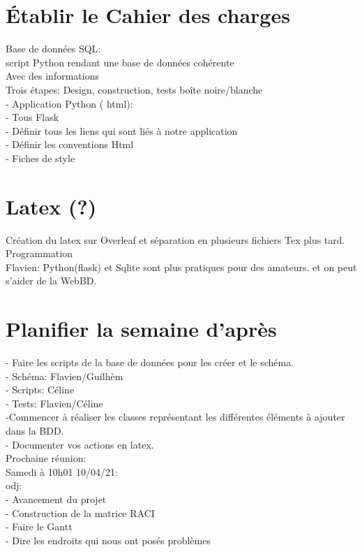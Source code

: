 \section{Établir le Cahier des charges}
Base de données SQL:\\
script Python rendant une base de données cohérente\\
Avec des informations\\
Trois étapes: Design, construction, tests boîte noire/blanche\\
	  - Application Python ( html):\\
			- Tous Flask\\
			- Définir tous les liens qui sont liés à notre application\\
			- Définir les conventions Html\\
			- Fiches de style\\
\section{Latex (?)}
Création du latex sur Overleaf et séparation en plusieurs fichiers Tex plus tard.\\
Programmation\\
 Flavien:  Python(flask) et Sqlite sont plus pratiques pour des amateurs. et on peut s’aider de la WebBD.\\

\section{ Planifier la semaine d'après }
	- Faire les scripts de la base de données pour les créer et le schéma.\\
		- Schéma: Flavien/Guilhèm\\
		- Scripts: Céline\\
		- Tests: Flavien/Céline\\
	-Commencer à réaliser les classes représentant les différentes éléments à ajouter dans la BDD.\\
	- Documenter vos actions en latex.\\
Prochaine réunion:\\
Samedi à 10h01 10/04/21:\\
	odj: \\
- Avancement du projet\\
	- Construction de la matrice RACI\\
	- Faire le Gantt\\
	- Dire les endroits qui nous ont posés problèmes\\
